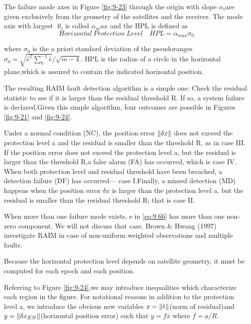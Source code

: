 		The failure mode axes in Figure \ref{fig:9-23} through the origin with slope $\alpha_i$are given exclusively from the geometry of the satellites and the receiver. The mode axis with largest $\aleph_i$is called $\alpha_max$ and the HPL is defined as
		\begin{equation}\label{eq:9.69}
			Horizontal\ Protection\ Level \quad HPL = \alpha_{max}\sigma_0
		\end{equation}
		
		where $\sigma_0$ is the a priori standard deviation of the pseudoranges \\$\sigma_0 = \sqrt{\hat{e}^T\sum^{-1}_b\hat{e}}/\sqrt{m-4}$.
		HPL is the radius of a circle in the horizontal plane,which is assured to contain the indicated horizontal position.
		
		The resulting RAIM fault detection algorithm is a simple one: Check the residual statistic to see if it is larger than the residual threshold R. If so, a system failure is declared.Given this simple algorithm, four outcomes are possible in Figures \ref{fig:9-21} and \ref{fig:9-24}.
		
		Under a normal condition (NC), the position error $\Arrowvert \delta x \Arrowvert $ does not exceed the protection level a and the residual is smaller than the threshold R, as in case III. If the position error does not exceed the protection level a, but the residual is larger than the threshold R,a false alarm (FA) has occurred, which is case IV. When both protection level and residual threshold have been breached, a detection failure (DF) has occurred— case I.Finally, a missed detection (MD) happens when the position error $\delta x$ is larger than the protection level a, but the residual is smaller than the residual threshold R; that is case II.
		
		When more than one failure mode exists, e in \ref{eq:9.66} has more than one non-zero component. We will not discuss that case. Brown $\&$ Hwang (1997) investigate RAIM in case of non-uniform weighted observations and multiple faults.
		
		Because the horizontal protection level depends on satellite geometry, it must be
		computed for each epoch and each position.
		
		Referring to Figure \ref{fig:9-24},we may introduce inequalities which characterize each region in the figure. For notational reasons in addition to the protection level a, we introduce the obvious new variables $x=\Arrowvert \hat{e} \Arrowvert$(norm of residual)and $y=\Arrowvert \delta x_{EN} \Arrowvert$(horizontal position error) such that $y=fx$ where $f= a/R$.
		
